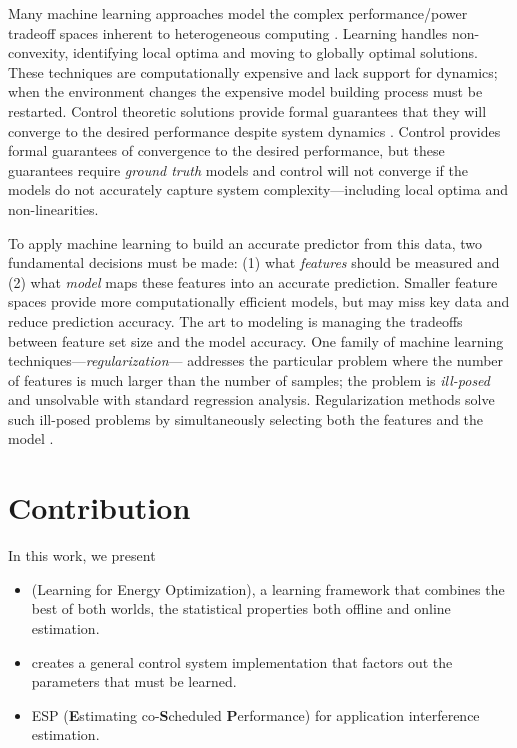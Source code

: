 Many machine learning approaches model the complex performance/power
tradeoff spaces inherent to heterogeneous computing
\cite{reddiHPCA2013,dubach2010,Bitirgen2008,Ipek,Koala,LEO,Flicker,Ponamarev,Paragon}.
Learning handles non-convexity, identifying local optima and moving to
globally optimal solutions. These techniques are computationally
expensive and lack support for dynamics; \ie{} when the environment
changes the expensive model building process must be restarted.
Control theoretic solutions provide formal guarantees that they will
converge to the desired performance despite system dynamics
\cite{Hellerstein2004a,Chen2011,POET,ControlWare,Agilos,grace2,JouleGuard}.
Control provides formal guarantees of convergence to the desired
performance, but these guarantees require \emph{ground truth} models
and control will not converge if the models do not accurately capture
system complexity---including local optima and non-linearities.

  To apply machine learning to build an
accurate predictor from this data, two fundamental decisions must be
made: (1) what \emph{features} should be measured and (2) what
\emph{model} maps these features into an accurate prediction.  Smaller
feature spaces provide more computationally efficient models, but
may miss key data and reduce prediction accuracy.  The art to modeling
is managing the tradeoffs between feature set size and the model
accuracy.  One family of machine learning
techniques---\emph{regularization}--- addresses the particular problem
where the number of features is much larger than the number of
samples; \ie the problem is \emph{ill-posed} and unsolvable with
standard regression analysis.  Regularization methods solve such
ill-posed problems by simultaneously selecting both the features and
the model
\cite{hoerl1988ridge,tibshirani1996regression,zou2005regularization}.


\section{Contribution}
In this work, we present

\begin{itemize}
  \item \SYSTEMLEO{} (Learning for Energy
  Optimization), a learning framework that combines the best of both
  worlds, \ie the statistical properties both offline and online
  estimation.
 \item \SYSTEM{} creates a general control system implementation that factors
 out the parameters that must be learned.
 \item ESP (\textbf{E}stimating co-\textbf{S}cheduled \textbf{P}erformance) for
 application interference estimation.
\end{itemize}

